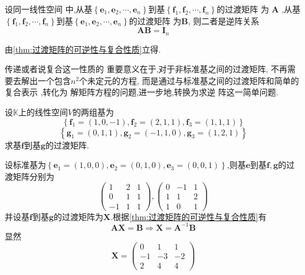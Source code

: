 \begin{green}
\begin{corollary}[过渡矩阵的逆阵]\label{cor:过渡矩阵的逆阵}
    设同一线性空间
    中,从基$\left\{
        \bm{e}_1,\bm{e}_2,\cdots
        ,\bm{e}_n
    \right\}$到基$
    \left\{
        \bm{f}_1,\bm{f}_2,\cdots,
        \bm{f}_n
    \right\}$的过渡矩阵
    为
    $\bm{A}$
    ,从基
    $\left\{
        \bm{f}_1,\bm{f}_2,\cdots
        ,\bm{f}_n
    \right\}$到基$
    \left\{
        \bm{e}_1,\bm{e}_2,\cdots,
        \bm{e}_n
    \right\}$的过渡矩阵
    为$\bm{B}$,
    则二者是逆阵关系
    \[
    \bm{AB} =  \bm{I}_n
    \]
\end{corollary}
\begin{Proof}
    由\cref{thm:过渡矩阵的可逆性与复合性质}立得.
\end{Proof}
\end{green}
\begin{red}
\begin{remark}
    传递或者说复合这一性质的
    重要意义在于,对于非标准基之间的过渡矩阵,
    不再需要去解出一个包含$n^2$个未定元的方程,
    而是通过与标准基之间的过渡矩阵和简单的复合表示
    ,转化为
    解矩阵方程的问题,进一步地,转换为求逆
    阵这一简单问题.
\end{remark}
\end{red}
\begin{brown}
\begin{example}
    设$\mathbb{K}$上的线性空间$V$的两组基为
    \[
    \left\{
        \bm{f}_1=\left(1,0,-1\right),\bm{f}_2=\left(2,1,1\right),\bm{f}_3=\left(1,1,1\right)
    \right\}
    \]\[\left\{
    \bm{g}_1=\left(0,1,1\right),\bm{g}_2=\left(-1,1,0\right),\bm{g}_3=\left(1,2,1\right)\right\}
    \]求基$\bm{f}$到基$\bm{g}$的过渡矩阵.
\end{example}
\begin{solution}
    设标准基为$\left\{\bm{e}_1=\left(1,0,0\right),\bm{e}_2=\left(0,1,0\right),\bm{e}_3=\left(0,0,1\right)\right\}$,则基$\bm{e}$到基$\bm{f},\bm{g}$的过渡矩阵分别为\[
    \begin{pmatrix}
        1&2&1\\
        0&1&1\\
        -1&1&1
    \end{pmatrix},\begin{pmatrix}
      0&-1&1\\
      1&1&2\\
      1&0&1  
    \end{pmatrix}
    \]并设基$\bm{f}$到基$\bm{g}$的过渡矩阵为$\bm{X}$.根据\cref{thm:过渡矩阵的可逆性与复合性质}有\[
    \bm{AX}=\bm{B}\Longrightarrow \bm{X}=\bm{A}^{-1}\bm{B}
    \]显然\[
    \bm{X}=\begin{pmatrix}
        0&1&1\\-1&-3&-2\\2&4&4
    \end{pmatrix}
    \]
\end{solution}
\end{brown}
